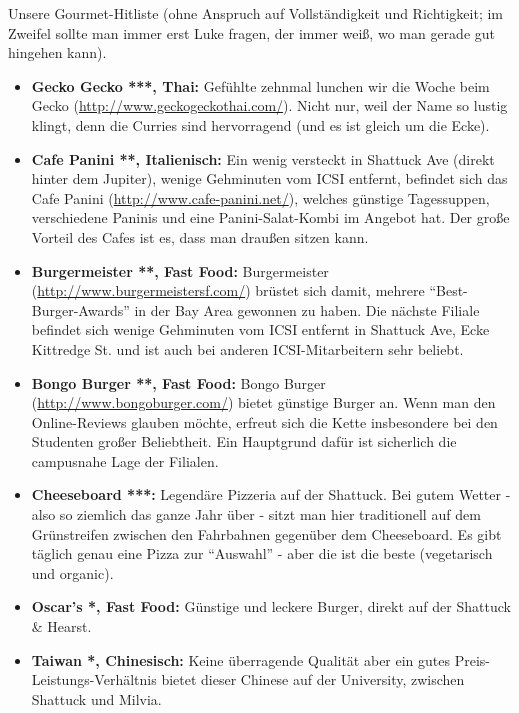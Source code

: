 \documentclass[a4paper]{scrreprt}
\begin{document}
Unsere Gourmet-Hitliste (ohne Anspruch auf Vollständigkeit und Richtigkeit; im Zweifel sollte man immer erst Luke fragen, der immer weiß, wo man gerade gut hingehen kann).

\begin{itemize}
  \item \textbf{Gecko Gecko ***, Thai:} Gefühlte zehnmal lunchen wir die Woche beim Gecko (\url{http://www.geckogeckothai.com/}). Nicht nur, weil der Name so lustig klingt, denn die Curries sind hervorragend (und es ist gleich um die Ecke).

	\item \textbf{Cafe Panini **, Italienisch:} Ein wenig versteckt in Shattuck Ave (direkt hinter dem Jupiter), wenige Gehminuten vom ICSI entfernt, befindet sich das Cafe Panini (\url{http://www.cafe-panini.net/}), welches günstige Tagessuppen, verschiedene Paninis und eine Panini-Salat-Kombi im Angebot hat. Der große Vorteil des Cafes ist es, dass man draußen sitzen kann.

  \item \textbf{Burgermeister **, Fast Food:} Burgermeister (\url{http://www.burgermeistersf.com/}) brüstet sich damit, mehrere	 "`Best-Burger-Awards"' in der Bay Area gewonnen zu haben. Die nächste Filiale befindet sich wenige Gehminuten vom ICSI entfernt in Shattuck Ave, Ecke Kittredge St. und ist auch bei anderen ICSI-Mitarbeitern sehr beliebt.

  \item \textbf{Bongo Burger **, Fast Food:} Bongo Burger (\url{http://www.bongoburger.com/}) bietet günstige Burger an. Wenn man den Online-Reviews glauben möchte, erfreut sich die Kette insbesondere bei den Studenten großer Beliebtheit. Ein Hauptgrund dafür ist sicherlich die campusnahe Lage der Filialen.

	\item \textbf{Cheeseboard ***:} Legendäre Pizzeria auf der Shattuck. Bei gutem Wetter - also so ziemlich das ganze Jahr über - sitzt man hier traditionell auf dem Grünstreifen zwischen den Fahrbahnen gegenüber dem Cheeseboard. Es gibt täglich genau eine Pizza zur "`Auswahl"' - aber die ist die beste (vegetarisch und organic).

  \item \textbf{Oscar's *, Fast Food:} Günstige und leckere Burger, direkt auf der Shattuck \& Hearst.

	\item \textbf{Taiwan *, Chinesisch:} Keine überragende Qualität aber ein gutes Preis-Leistungs-Verhältnis bietet dieser Chinese auf der University, zwischen Shattuck und Milvia.


\end{itemize}
\end{document}
